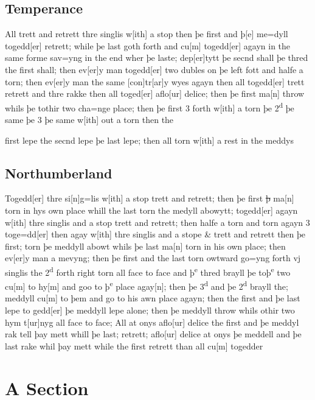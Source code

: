\documentclass[12pt,letter]{article} %
\newcommand{\srcpg}[1]{
    \noindent{
        \color{Gray}{\rule[0.5ex]{\linewidth}{1pt}~#1} 
        \\
    }
}
\begin{document}
\subsection{Temperance}
\srcpg{70} All trett and retrett thre singlis w{[}ith{]} a stop then þe
first and þ{[}e{]} me=dyll togedd{[}er{]} retrett; while þe last goth
forth and cu{[}m{]} togedd{[}er{]} agayn in the same forme sav=yng in
the end wher þe laste; dep{[}er{]}tytt þe secnd shall þe thred the first
shall; then ev{[}er{]}y man togedd{[}er{]} two dubles on þe left fott
and halfe a torn; then ev{[}er{]}y man the same {[}con{]}tr{[}ar{]}y
wyes agayn then all togedd{[}er{]} trett retrett and thre rakke then all
toged{[}er{]} aflo{[}ur{]} delice; then þe first ma{[}n{]} throw whils
þe tothir two cha=nge place; then þe first 3 forth w{[}ith{]} a torn þe
2\textsuperscript{d} þe same þe 3 þe same w{[}ith{]} out a torn then the
\srcpg{71} first lepe the secnd lepe þe last lepe; then all torn
w{[}ith{]} a rest in the meddys

\subsection{Northumberland}
Togedd{[}er{]} thre si{[}n{]}g=lis w{[}ith{]} a stop trett and retrett;
then þe first \sout{þ} ma{[}n{]} torn in hys own place whill the last
torn the medyll abowytt; togedd{[}er{]} agayn w{[}ith{]} thre singlis
and a stop trett and retrett; then halfe a torn and torn agayn 3
toge=dd{[}er{]} then agay w{[}ith{]} thre singlis and a stope \& trett
and retrett then þe first; torn þe meddyll abowt whils þe last ma{[}n{]}
torn in his own place; then ev{[}er{]}y man a mevyng; then þe first and
the last torn owtward go=yng forth vj singlis the 2\textsuperscript{d}
forth \srcpg{72} right torn all face to face and þ\textsuperscript{e}
thred brayll þe toþ\textsuperscript{e} two cu{[}m{]} to hy{[}m{]} and
goo to þ\textsuperscript{e} place agay{[}n{]}; then þe
3\textsuperscript{d} and þe 2\textsuperscript{d} brayll the; meddyll
cu{[}m{]} to þem and go to his awn place agayn; then the first and þe
last lepe to gedd{[}er{]} þe meddyll lepe alone; then þe meddyll throw
whils othir two hym t{[}ur{]}nyg all face to face; All at onys
aflo{[}ur{]} delice the first and þe meddyl rak tell þay mett whill þe
last; retrett; aflo{[}ur{]} delice at onys þe meddell and þe last rake
whil þay mett while the first retrett than all cu{[}m{]} togedder

\newpage

    \section{A Section}
    \lipsum[1]
    
    \nocite{*}
    
    
\end{document}
